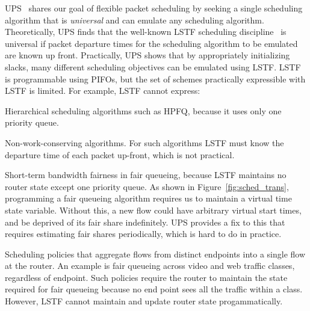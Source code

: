 

 UPS~\cite{ups} shares our goal of
flexible packet scheduling by seeking a single scheduling algorithm that is
{\em universal} and can emulate any scheduling algorithm. Theoretically, UPS
finds that the well-known LSTF scheduling discipline~\cite{lstf} is universal
if packet departure times for the scheduling algorithm to be emulated are known
up front. Practically, UPS shows that by appropriately initializing slacks, many different scheduling objectives can be
emulated using LSTF. LSTF is programmable using PIFOs, but the set of schemes
practically expressible with LSTF is limited. For example, LSTF cannot
express:
\begin{CompactEnumerate}
\item Hierarchical scheduling algorithms such as HPFQ, because it
  uses only one priority queue.
\item Non-work-conserving algorithms. For such algorithms LSTF must know the
  departure time of each packet up-front, which is not practical.
\item Short-term bandwidth fairness in fair queueing, because LSTF maintains no
  router state except one priority queue. As shown in
  Figure~\ref{fig:sched_trans}, programming a fair queueing algorithm requires us
  to maintain a virtual time state variable. Without this, a new flow could have
  arbitrary virtual start times, and be deprived of its fair share indefinitely.
  UPS provides a fix to this that requires
  estimating fair shares periodically, which is hard to do in
  practice.
\item Scheduling policies that aggregate flows from distinct endpoints into a
  single flow at the router. An example is fair queueing across video and web
  traffic classes, regardless of endpoint.  Such policies require the router to
  maintain the state required for fair queueing because no end point sees all the
  traffic within a class.  However, LSTF cannot maintain and update router state
  progammatically.
\end{CompactEnumerate}


